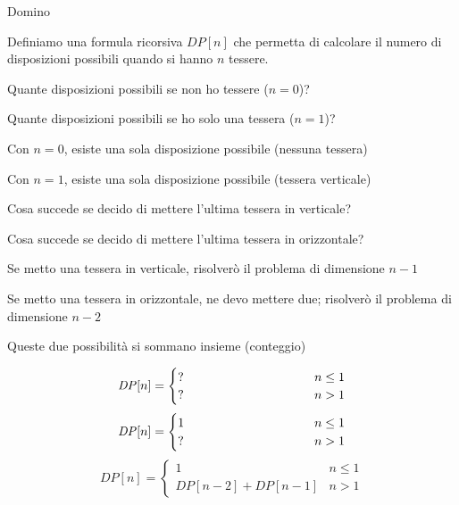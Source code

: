 \begin{frame}{Domino}

\vspace{-9pt}
\begin{myboxtitle}
Definiamo una formula ricorsiva $\mathit{DP}[n]$ che permetta di calcolare il numero di disposizioni possibili quando si hanno $n$ tessere.
\end{myboxtitle}

\begin{overprint}
\BIL
\item Quante disposizioni possibili se non ho tessere ($n=0$)?
\item Quante disposizioni possibili se ho solo una tessera ($n=1$)?
\EIL
{}
\BIL
\item Con $n=0$, esiste una sola disposizione possibile (nessuna tessera)
\item Con $n=1$, esiste una sola disposizione possibile (tessera verticale)
\EIL
{}
\BIL
\item Cosa succede se decido di mettere l'ultima tessera in verticale?
\item Cosa succede se decido di mettere l'ultima tessera in orizzontale?
\EI
{}
\BIL
\item Se metto una tessera in verticale, risolverò il problema
di dimensione $n-1$
\item Se metto una tessera in orizzontale, ne devo mettere due; risolverò
il problema di dimensione $n-2$
\item Queste due possibilità si sommano insieme (conteggio)
\EIL
\end{overprint}

\bigskip
\begin{overprint}
\[
\mathit{DP}[n] = \begin{cases}
  ? & n \leq 1 \\
  \makebox[3.5cm][l]{?} & n>1
\end{cases}
\]
\[
\mathit{DP}[n] = \begin{cases}
  1 & n \leq 1 \\
  \makebox[3.5cm][l]{?} & n>1
\end{cases}
\]
\[
\mathit{DP}[n] = \begin{cases}
  1 & n \leq 1 \\
  \mathit{DP}[n-2]+\mathit{DP}[n-1] & n>1
\end{cases}
\]
\end{overprint}

\end{frame}

